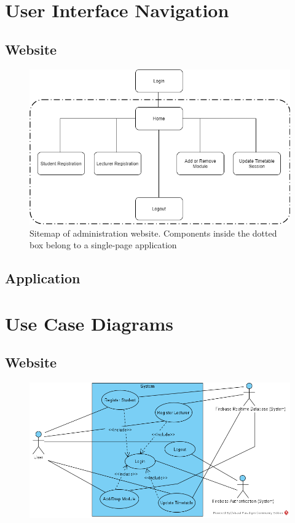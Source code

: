 \documentclass[../report.tex]{subfiles}
\begin{document}
\section{User Interface Navigation}
\subsection{Website}
\begin{figure}[H]
\centering
\includegraphics[width=\textwidth]{./images/05-05-web-nav.png}
\caption{Sitemap of administration website. Components  inside the dotted box belong to a single-page application}
\label{fig:beam-profile}
\end{figure}

\subsection{Application}

\section{Use Case Diagrams}
\subsection{Website}
\begin{figure}[H]
\centering
\includegraphics[width=\textwidth]{./images/05-06-web-use-case.png}
\label{fig:web-use-case}
\end{figure}
\end{document}
